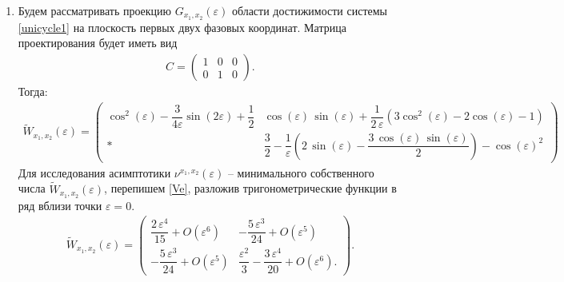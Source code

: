 \documentclass[../main.tex]{subfiles}
\begin{document}
    \begin{enumerate}
        \item Будем рассматривать проекцию $ G_{x_1, x_2}(\varepsilon) $ области достижимости системы \eqref{unicycle1} на плоскость первых двух фазовых координат. Матрица проектирования будет иметь вид
        \begin{gather*}
            C = \begin{pmatrix}
                1 & 0 & 0 \\ 
                0 & 1 & 0 
            \end{pmatrix}. 
        \end{gather*} 
        Тогда: \small
        \begin{gather}\label{Ve}
            \widetilde{W}_{x_1,x_2}(\varepsilon)= \begin{pmatrix}
                \cos^2(\varepsilon)-\dfrac{3}{4\varepsilon}\sin(2\varepsilon)+\dfrac{1}{2} & 
                \cos\left(\varepsilon \right)\,\sin\left(\varepsilon \right)+\dfrac{1}{2\,\varepsilon}\left( 3\cos^2\left(\varepsilon \right)-2\cos\left(\varepsilon\right)-1\right) \\[6pt]
                * &
                \dfrac{3}{2}-\dfrac{1}{\varepsilon }\left(2\,\sin\left(\varepsilon \right)-\dfrac{3\,\cos\left(\varepsilon \right)\,\sin\left(\varepsilon \right)}{2} \right) -{\cos\left(\varepsilon \right)}^2 
            \end{pmatrix}
        \end{gather}
        \normalsize
        Для исследования асимптотики $ \nu^{x_1,x_2}(\varepsilon) $ -- минимального собственного числа $ \widetilde{W}_{x_1,x_2}(\varepsilon) $, перепишем \eqref{Ve}, разложив тригонометрические функции в ряд вблизи точки $ \varepsilon = 0 $.
        \begin{gather*}
            \widetilde{W}_{x_1,x_2}(\varepsilon) = \begin{pmatrix}
                \dfrac{2\,\varepsilon ^4}{15} + O(\varepsilon^6)&
                -\dfrac{5\,\varepsilon ^3}{24} + O(\varepsilon^5)\\[8pt]
                -\dfrac{5\,\varepsilon ^3}{24} + O(\varepsilon^5) & 
                \dfrac{\varepsilon ^2}{3}-\dfrac{3\,\varepsilon ^4}{20} + O(\varepsilon^6).
            \end{pmatrix}.
        \end{gather*}
        

\end{enumerate}
\end{document}

